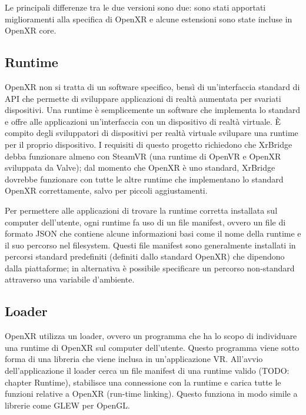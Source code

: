 \documentclass[twoside]{supsistudent}
\begin{document}
Le principali differenze tra le due versioni sono due: sono stati apportati miglioramenti alla specifica di OpenXR e alcune estensioni sono state incluse in OpenXR core.

\subsection{Runtime}

OpenXR non si tratta di un software specifico, bensì di un'interfaccia standard di API che permette di sviluppare applicazioni di realtà aumentata per svariati dispositivi. Una runtime è semplicemente un software che implementa lo standard e offre alle applicazioni un'interfaccia con un dispositivo di realtà virtuale. È compito degli sviluppatori di dispositivi per realtà virtuale svilupare una runtime per il proprio dispositivo. I requisiti di questo progetto richiedono che XrBridge debba funzionare almeno con SteamVR (una runtime di OpenVR e OpenXR sviluppata da Valve); dal momento che OpenXR è uno standard, XrBridge dovrebbe funzionare con tutte le altre runtime che implementano lo standard OpenXR correttamente, salvo per piccoli aggiustamenti.

Per permettere alle applicazioni di trovare la runtime corretta installata sul computer dell'utente, ogni runtime fa uso di un file manifest, ovvero un file di formato JSON che contiene alcune informazioni basi come il nome della runtime e il suo percorso nel filesystem. Questi file manifest sono generalmente installati in percorsi standard predefiniti (definiti dallo standard OpenXR) che dipendono dalla piattaforme; in alternativa è possibile specificare un percorso non-standard attraverso una variabile d'ambiente.


\subsection{Loader}

OpenXR utilizza un loader, ovvero un programma che ha lo scopo di individuare una runtime di OpenXR sul computer dell'utente. Questo programma viene sotto forma di una libreria che viene inclusa in un'applicazione VR. All'avvio dell'applicazione il loader cerca un file manifest di una runtime valido (TODO: chapter Runtime), stabilisce una connessione con la runtime e carica tutte le funzioni relative a OpenXR (run-time linking). Questo funziona in modo simile a librerie come GLEW per OpenGL.
\end{document}
